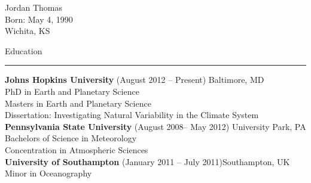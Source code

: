 \begin{cv}

  \begin{centering}
    \Huge{Jordan Thomas}\\
    \normalsize{Born: May 4, 1990}\\
    \normalsize{Wichita, KS}\\
  \end{centering}
  \vspace{1cm}
  \noindent\Large{Education}\\
  \vspace{0.2cm}
  \noindent\rule{\textwidth}{0.4pt}
  \normalsize{
  \noindent \textbf{Johns Hopkins University} (August 2012 -- Present) \hfill Baltimore, MD\\
	\indent PhD in Earth and Planetary Science\\
	\indent Masters in Earth and Planetary Science\\
	\indent Dissertation: Investigating Natural Variability in the Climate System\\
  \noindent \textbf{Pennsylvania State University} (August 2008-- May 2012) \hfill University Park, PA\\
	\indent Bachelors of Science in Meteorology\\
	\indent Concentration in Atmospheric Sciences \\
  \noindent \textbf{University of Southampton} (January 2011 -- July 2011)\hfill Southampton, UK\\
	\indent Minor in Oceanography\\
  }


\end{cv}
